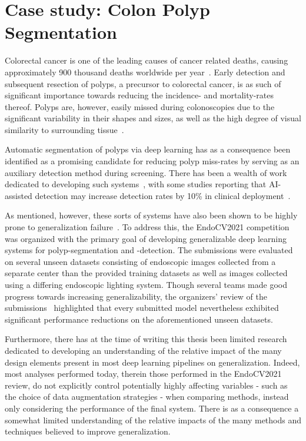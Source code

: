     \section{Case study: Colon Polyp Segmentation}   
    Colorectal cancer is one of the leading causes of cancer related deaths, causing approximately 900 thousand deaths worldwide per year~\cite{colorectal_cancer}. Early detection and subsequent resection of polyps, a precursor to colorectal cancer, is as such of significant importance towards reducing the incidence- and mortality-rates thereof. Polyps are, however, easily missed during colonoscopies due to the significant variability in their shapes and sizes, as well as the high degree of visual similarity to surrounding tissue~\cite{missrate1, missrate2}. 
    
    Automatic segmentation of polyps via deep learning has as a consequence been identified as a promising candidate for reducing polyp miss-rates by serving as an auxiliary detection method during screening. There has been a wealth of work dedicated to developing such systems~\cite{endotect, endocv2020, endocv2021, ddanet}, with some studies reporting that AI-assisted detection may increase detection rates by 10\% in clinical deployment~\cite{polyp-success-story}.  
    
    As mentioned, however, these sorts of systems have also been shown to be highly prone to generalization failure~\cite{damour2020underspecification, shortcut_learning, endocv2021_review}. To address this, the EndoCV2021 competition~\cite{endocv2021} was organized with the primary goal of developing generalizable deep learning systems for polyp-segmentation and -detection. The submissions were evaluated on several unseen datasets consisting of endoscopic images collected from a separate center than the provided training datasets as well as images collected using a differing endoscopic lighting system. Though several teams made good progress towards increasing generalizability, the organizers' review of the submissions~\cite{endocv2021_review} highlighted that every submitted model nevertheless exhibited significant performance reductions on the aforementioned unseen datasets. 

    Furthermore, there has at the time of writing this thesis been limited research dedicated to developing an understanding of the relative impact of the many design elements present in most deep learning pipelines on generalization. Indeed, most analyses performed today, therein those performed in the EndoCV2021 review\cite{endocv2021_review}, do not explicitly control potentially highly affecting variables - such as the choice of data augmentation strategies -  when comparing methods, instead only considering the performance of the final system. There is as a consequence a somewhat limited understanding of the relative impacts of the many methods and techniques believed to improve generalization.  
    
